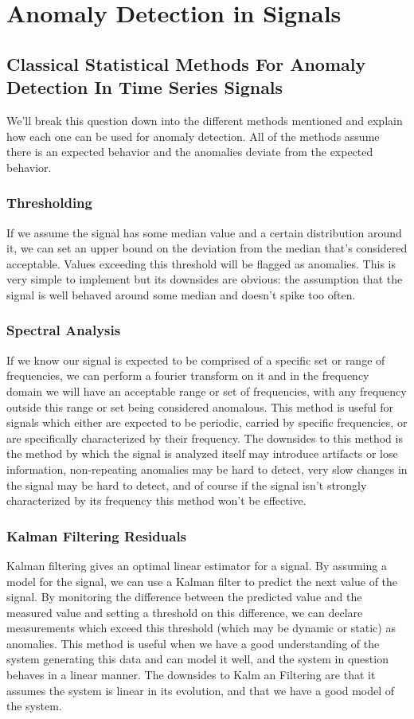 \clearpage
\section{Anomaly Detection in Signals}
\subsection{Classical Statistical Methods For Anomaly Detection In Time Series Signals}
We'll break this question down into the different methods mentioned and explain how each one can be used for anomaly detection. All of the methods assume there is an expected behavior and the anomalies deviate from the expected behavior.
\subsubsection{Thresholding}
If we assume the signal has some median value and a certain distribution around it, we can set an upper bound on the deviation from the median that's considered acceptable. Values exceeding this threshold will be flagged as anomalies. This is very simple to implement but its downsides are obvious: the assumption that the signal is well behaved around some median and doesn't spike too often.
\subsubsection{Spectral Analysis}
If we know our signal is expected to be comprised of a specific set or range of frequencies, we can perform a fourier transform on it and in the frequency domain we will have an acceptable range or set of frequencies, with any frequency outside this range or set being considered anomalous. This method is useful for signals which either are expected to be periodic, carried by specific frequencies, or are specifically characterized by their frequency. The downsides to this method is the method by which the signal is analyzed itself may introduce artifacts or lose information, non-repeating anomalies may be hard to detect, very slow changes in the signal may be hard to detect, and of course if the signal isn't strongly characterized by its frequency this method won't be effective.
\subsubsection{Kalman Filtering Residuals}
Kalman filtering gives an optimal linear estimator for a signal. By assuming a model for the signal, we can use a Kalman filter to predict the next value of the signal. By monitoring the difference between the predicted value and the measured value and setting a threshold on this difference, we can declare measurements which exceed this threshold (which may be dynamic or static) as anomalies. This method is useful when we have a good understanding of the system generating this data and can model it well, and the system in question behaves in a linear manner. The downsides to Kalm an Filtering are that it assumes the system is linear in its evolution, and that we have a good model of the system.
